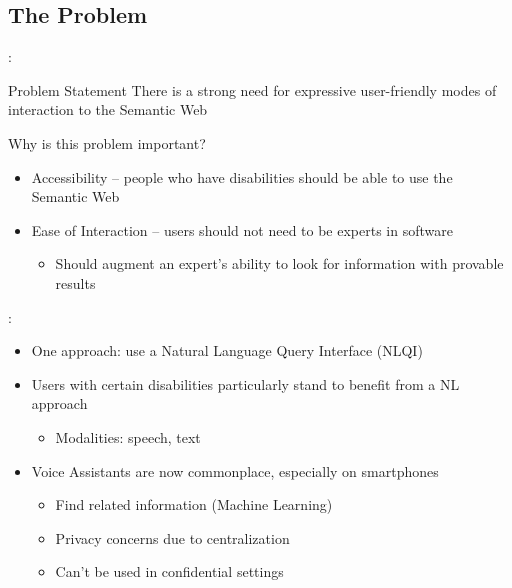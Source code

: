 \documentclass[logoontitle,tabu,supertabular,aspectratio=43]{preney-uwindsor-beamer}
\begin{document}
    \subsection{The Problem}
    \begin{frame}{\insertsection: \insertsubsection}

        \begin{block}{Problem Statement}
            There is a strong need for expressive user-friendly modes of interaction to the Semantic Web %
        \end{block}

        Why is this problem important?
        \begin{itemize}
            \item Accessibility -- people who have disabilities should be able to use the Semantic Web
            \item Ease of Interaction -- users should not need to be experts in software
            \begin{itemize}
                \item Should augment an expert's ability to look for information with provable results
            \end{itemize}
        \end{itemize}

    \end{frame}

    \begin{frame}{\insertsection: \insertsubsection}
    \begin{itemize}
        \item One approach: use a Natural Language Query Interface (NLQI)
        \item Users with certain disabilities particularly stand to benefit from a NL approach
        \begin{itemize}
            \item Modalities: speech, text
        \end{itemize}
        \item Voice Assistants are now commonplace, especially on smartphones
        \begin{itemize}
            \item Find related information (Machine Learning)
            \item Privacy concerns due to centralization
            \item Can't be used in confidential settings
        \end{itemize}
    \end{itemize}
    \end{frame}
\end{document}
